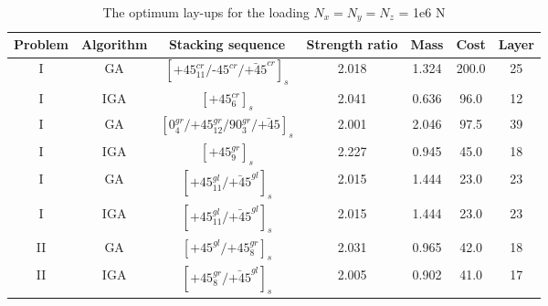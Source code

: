 \documentclass[USenglish,twocolumn]{article}
\begin{document}
\begin{table}
	\caption{The optimum lay-ups for the loading $N_x=N_y=N_z$ = 1e6 N} 
	\centering
	\begin{adjustbox}{width=1\textwidth}
	\begin{tabular}{ccccccc}
	\toprule
	       Problem  &   Algorithm      & Stacking sequence                                    & Strength ratio  & Mass  &  Cost   & Layer    \\ 
	\midrule																								  
	   	  I  & GA   &  $[\text{+}45_{11}^{cr}/\text{-}45^{cr}/\bar{\text{+}45}^{cr}]_s$                            & 2.018           & 1.324 &  200.0  & 25  \\
	      I  & IGA  &  $[\text{+}45_{6}^{cr}]_s$                            & 2.041           & 0.636 &  96.0  & 12  \\
          I  & GA   &  $[0_4^{gr}/\text{+}45_{12}^{gr}/90_3^{gr}/\bar{\text{+}45}]_s$                            & 2.001           & 2.046 &  97.5  & 39  \\
		  I  & IGA  &  $[\text{+}45_{9}^{gr}]_s$                            & 2.227           & 0.945 &  45.0  & 18  \\
		  I  & GA   &  $[\text{+}45_{11}^{gl}/\bar{\text{+}45}^{gl}]_s$                            & 2.015           & 1.444 &  23.0  & 23  \\
		  I  & IGA  &   $[\text{+}45_{11}^{gl}/\bar{\text{+}45}^{gl}]_s$                           & 2.015           & 1.444 &  23.0  & 23  \\
		  II &  GA  &  $[\text{+}45^{gl}/\text{+}45_{8}^{gr}]_s$          & 2.031           & 0.965 &  42.0  & 18 \\
		  II & IGA  &  $[\text{+}45_8^{gr}/\bar{\text{+}45}^{gl}]_s$          & 2.005           & 0.902 &  41.0  & 17 \\
	\bottomrule
\end{tabular}
\label{tab:NxNyNz}
	\end{adjustbox}
\end{table}
\end{document}
